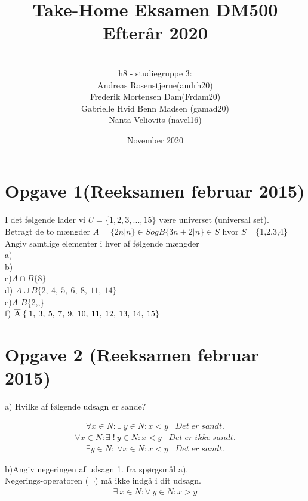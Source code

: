 \documentclass{article}
\title{Take-Home Eksamen DM500 Efterår 2020}
\author{
\\
h8 - studiegruppe 3:
\\
Andreas Rosenstjerne(andrh20)
\\
Frederik Mortensen Dam(Frdam20)
\\
Gabrielle Hvid Benn Madsen (gamad20)
\\
Nanta Veliovits (navel16)
\\
}
\date{November 2020}
\begin{document}
\maketitle
\pagebreak

\section{Opgave 1(Reeksamen februar 2015)}
I det følgende lader vi $U = \{ 1,2,3,...,15 \} $ være universet (universal set). 
\\
\newline Betragt de to mængder
\newline
\begin{math}
A = \{ 2n|n \} \in S og B \{ 3n + 2|n \} \in S 
\end{math}
\newline hvor $S$= \{1,2,3,4\}
\\
\newline Angiv samtlige elementer i hver af følgende mængder
\\
\newline
a)
\\
\newline
b)
\\
\newline
c)\;$A \cap B \{ 8 \} $
\\
\newline
d)\; $A \cup B \{2,\:4,\:5,\:6,\:8,\:11,\:14\} $
\\
\newline
e)\;$A$\:-\:$B$\:\{2,,\}
\\
\newline
f)\; $\overline{\rm A}\;\{\:1,\:3,\:5,\:7,\:9,\:10,\:11,\:12,\:13,\:14,\:15\} $

\section{Opgave 2 (Reeksamen februar 2015)}
a)\; Hvilke af følgende udsagn er sande?

\begin{align*}
\forall x \in N:\exists\:y \in N: x< y \;\;\;Det\;er\;sandt.
\end{align*} 
\begin{align*}
\forall x \in N:\exists\;!\:y \in N: x< y \;\;\;Det\;er\;ikke\;sandt.
\end{align*} 
\begin{align*}
\exists y \in N:\:\forall x \in N: x< y \;\;\;Det\;er\;sandt.
\end{align*} 

b)\;Angiv negeringen af udsagn 1. fra spørgsmål a).\\\newline Negerings-operatoren (¬) må ikke indgå i dit udsagn.
 \begin{align*}
\exists\: x \in N:\forall\:y \in N: x > y 
\end{align*} 
\end{document}
